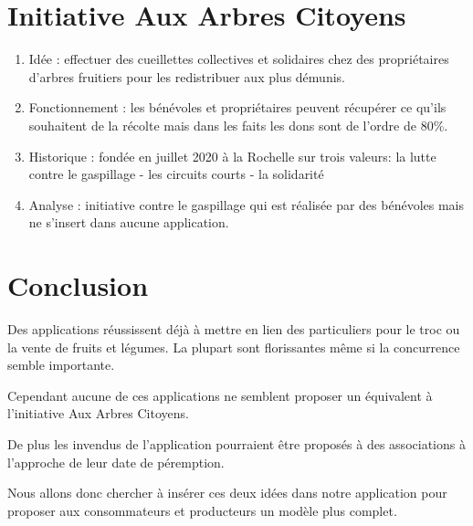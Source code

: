 \documentclass{article}
\begin{document}
\section{Initiative Aux Arbres Citoyens}
\begin{enumerate}
    \item Idée : effectuer des cueillettes collectives et solidaires
    chez des propriétaires d'arbres fruitiers pour les redistribuer
    aux plus démunis.
    \item Fonctionnement : les bénévoles et propriétaires peuvent récupérer
    ce qu'ils souhaitent de la récolte mais dans les faits les dons sont
    de l'ordre de 80\%.
    \item Historique : fondée en juillet 2020 à la Rochelle sur trois
    valeurs: la lutte contre le gaspillage
             - les circuits courts
             - la solidarité
    \item Analyse : initiative contre le gaspillage qui est réalisée par
    des bénévoles mais ne s'insert dans aucune application.
\end{enumerate}

\section{Conclusion}

Des applications réussissent déjà à mettre en lien des particuliers pour
le troc ou la vente de fruits et légumes. La plupart sont florissantes même 
si la concurrence semble importante.

Cependant aucune de ces applications ne semblent proposer un équivalent à l'initiative Aux Arbres Citoyens.


De plus les invendus de l'application pourraient être proposés à des 
associations à l'approche de leur date de péremption.


Nous allons donc chercher à insérer ces deux idées dans notre application
pour proposer aux consommateurs et producteurs un modèle plus complet.
\end{document}
